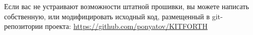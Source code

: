 \label{implement}\secdown

Если вас не устраивают возможности штатной прошивки, вы можете написать
собственную, или модифицировать исходный код, размещенный в git-репозитории
проекта: \url{https://github.com/ponyatov/KITFORTH}







\secup
